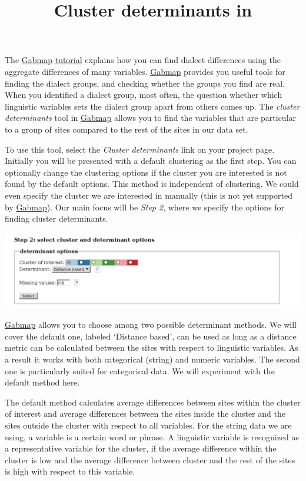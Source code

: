 \documentclass{article}
\title{Cluster determinants in \gabmap{}}
\date{}
\newcommand{\gabmap}{\href{http://www.gabmap.nl/}{Gabmap}}
\begin{document}
\maketitle{}

The \gabmap{} \href{http://www.gabmap.nl/~app/doc/tutorial/}{tutorial}
explains how you can find dialect differences using the aggregate
differences of many variables. \gabmap{} provides you useful tools for
finding the dialect groups, and checking whether the groups you find
are real. When you identified a dialect group, most often, the
question whether which linguistic variables sets the dialect group
apart from others comes up. The \emph{cluster determinants} tool in
\gabmap{} allows you to find the variables that are particular to a
group of sites compared to the rest of the sites in our data set.

To use this tool, select the \emph{Cluster determinants} link on your
project page. Initially you will be presented with a default
clustering as the first step. You can optionally change the clustering
options if the cluster you are interested is not found by the default
options. This method is independent of clustering. We could even
specify the cluster we are interested in manually (this is not yet
supported by \gabmap{}). Our main focus will be \emph{Step 2}, where
we specify the options for finding cluster determinants.

\begin{center}
\includegraphics[width=\textwidth]{images/determinant-options.png}
\end{center}

\gabmap{} allows you to choose among two possible determinant methods.
We will cover the default one, labeled `Distance based', can be used 
as long as a distance metric can be calculated between
the sites with respect to linguistic variables. As a result it works
with both categorical (string) and numeric variables. The second one
is particularly suited for categorical data. We will experiment with
the default method here.

The default method calculates average differences between sites within
the cluster of interest and average differences between the sites
inside the cluster and the sites outside the cluster with respect to
all variables. For the string data we are using, a variable is a
certain word or phrase. A linguistic variable is recognized as a
representative variable for the cluster, if the average difference
within the cluster is low and the average difference between cluster
and the rest of the sites is high with respect to this variable.
\end{document}
